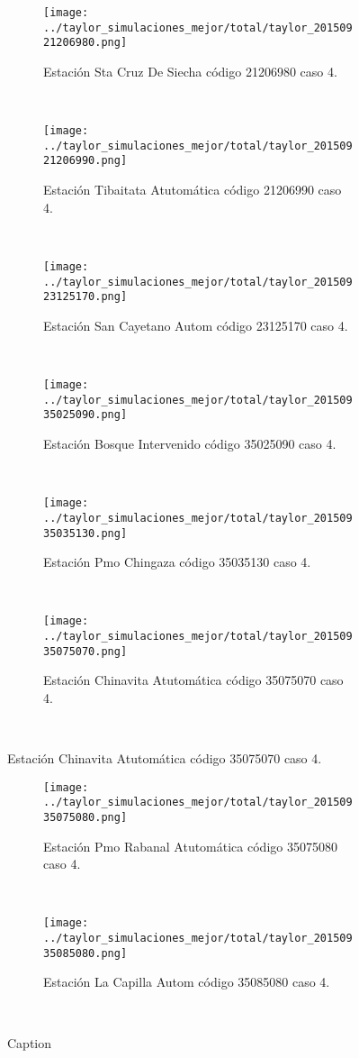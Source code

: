 \begin{figure}[H]
\centering
\begin{subfigure}[normla]{0.4\textwidth}
\texttt{[image: ../taylor\_simulaciones\_mejor/total/taylor\_20150921206980.png]}
\caption{Estación Sta Cruz De Siecha código 21206980 caso 4.}
\end{subfigure}
~
\begin{subfigure}[normla]{0.4\textwidth}
\texttt{[image: ../taylor\_simulaciones\_mejor/total/taylor\_20150921206990.png]}
\caption{Estación Tibaitata Atutomática código 21206990 caso 4.}
\end{subfigure}
~
\begin{subfigure}[normla]{0.4\textwidth}
\texttt{[image: ../taylor\_simulaciones\_mejor/total/taylor\_20150923125170.png]}
\caption{Estación San Cayetano Autom código 23125170 caso 4.}
\end{subfigure}
~
\begin{subfigure}[normla]{0.4\textwidth}
\texttt{[image: ../taylor\_simulaciones\_mejor/total/taylor\_20150935025090.png]}
\caption{Estación Bosque Intervenido código 35025090 caso 4.}
\end{subfigure}
~
\begin{subfigure}[normla]{0.4\textwidth}
\texttt{[image: ../taylor\_simulaciones\_mejor/total/taylor\_20150935035130.png]}
\caption{Estación Pmo Chingaza código 35035130 caso 4.}
\end{subfigure}
~
\begin{subfigure}[normla]{0.4\textwidth}
\texttt{[image: ../taylor\_simulaciones\_mejor/total/taylor\_20150935075070.png]}
\caption{Estación Chinavita Atutomática código 35075070 caso 4.}
\end{subfigure}
~
\end{figure}
 
\begin{figure}[H]\ContinuedFloat
\centering
\begin{subfigure}[normla]{0.4\textwidth}
\texttt{[image: ../taylor\_simulaciones\_mejor/total/taylor\_20150935075080.png]}
\caption{Estación Pmo Rabanal Atutomática código 35075080 caso 4.}
\end{subfigure}
~
\begin{subfigure}[normla]{0.4\textwidth}
\texttt{[image: ../taylor\_simulaciones\_mejor/total/taylor\_20150935085080.png]}
\caption{Estación La Capilla Autom código 35085080 caso 4.}
\end{subfigure}
~

 
 \caption{Caption}
 \label{fig:my_label}
\end{figure}
